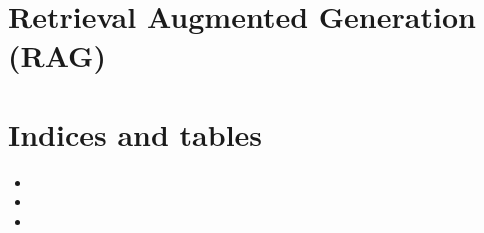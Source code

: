 \documentclass[letterpaper,10pt,english]{sphinxmanual}
\begin{document}
\begin{fulllineitems}
\begin{fulllineitems}
\end{fulllineitems}


\end{fulllineitems}


\sphinxstepscope


\chapter{Retrieval Augmented Generation (RAG)}
\label{\detokenize{retrieval_augmented_generation:retrieval-augmented-generation-rag}}\label{\detokenize{retrieval_augmented_generation::doc}}

\chapter{Indices and tables}
\label{\detokenize{index:indices-and-tables}}\begin{itemize}
\item {} 
\sphinxAtStartPar
{}

\item {} 
\sphinxAtStartPar
{}

\item {} 
\sphinxAtStartPar
{}

\end{itemize}


\renewcommand{\indexname}{Python Module Index}
\begin{sphinxtheindex}
\let\bigletter\sphinxstyleindexlettergroup
\bigletter{a}
\item\relax{}
\item\relax{}
\end{sphinxtheindex}

\renewcommand{\indexname}{Index}
\printindex
\end{document}
